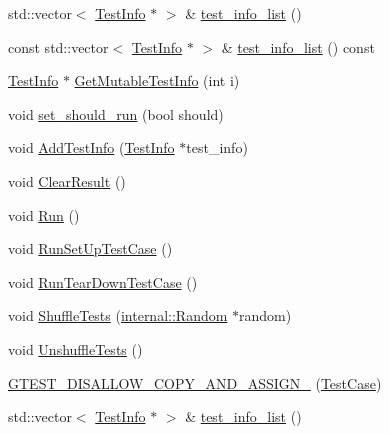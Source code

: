 \begin{DoxyCompactItemize}
\item 
std\-::vector$<$ \hyperlink{classtesting_1_1TestInfo}{\-Test\-Info} $\ast$ $>$ \& \hyperlink{classtesting_1_1TestCase_aaa94fcfd7f8161d39504f535fa995c2d}{test\-\_\-info\-\_\-list} ()
\item 
const std\-::vector$<$ \hyperlink{classtesting_1_1TestInfo}{\-Test\-Info} $\ast$ $>$ \& \hyperlink{classtesting_1_1TestCase_af56750ff9e6c7865f20ae51cfc8d793e}{test\-\_\-info\-\_\-list} () const 
\item 
\hyperlink{classtesting_1_1TestInfo}{\-Test\-Info} $\ast$ \hyperlink{classtesting_1_1TestCase_aeea35099284cdd7127924592152e3b73}{\-Get\-Mutable\-Test\-Info} (int i)
\item 
void \hyperlink{classtesting_1_1TestCase_ab3f3dbe8ef52473f912aef44d04193d5}{set\-\_\-should\-\_\-run} (bool should)
\item 
void \hyperlink{classtesting_1_1TestCase_a2a0417de1ee92080aae4676c77318b01}{\-Add\-Test\-Info} (\hyperlink{classtesting_1_1TestInfo}{\-Test\-Info} $\ast$test\-\_\-info)
\item 
void \hyperlink{classtesting_1_1TestCase_a566dca6156477ed747aa781f341d13d5}{\-Clear\-Result} ()
\item 
void \hyperlink{classtesting_1_1TestCase_aa3eca255b6be227d7d901cc2a72017a5}{\-Run} ()
\item 
void \hyperlink{classtesting_1_1TestCase_a0a9185d58f27f485506f4c0dedaab124}{\-Run\-Set\-Up\-Test\-Case} ()
\item 
void \hyperlink{classtesting_1_1TestCase_a68c2b3492b96c37271344d40a79caa84}{\-Run\-Tear\-Down\-Test\-Case} ()
\item 
void \hyperlink{classtesting_1_1TestCase_a0005a140538304e16d0bbd0bf08b3b65}{\-Shuffle\-Tests} (\hyperlink{classtesting_1_1internal_1_1Random}{internal\-::\-Random} $\ast$random)
\item 
void \hyperlink{classtesting_1_1TestCase_ae4c0afbfb6a7d13aece4c3a256a5d01d}{\-Unshuffle\-Tests} ()
\item 
\hyperlink{classtesting_1_1TestCase_a589179a7edfbdc3809f75a5bd7090dee}{\-G\-T\-E\-S\-T\-\_\-\-D\-I\-S\-A\-L\-L\-O\-W\-\_\-\-C\-O\-P\-Y\-\_\-\-A\-N\-D\-\_\-\-A\-S\-S\-I\-G\-N\-\_\-} (\hyperlink{classtesting_1_1TestCase}{\-Test\-Case})
\item 
std\-::vector$<$ \hyperlink{classtesting_1_1TestInfo}{\-Test\-Info} $\ast$ $>$ \& \hyperlink{classtesting_1_1TestCase_aaa94fcfd7f8161d39504f535fa995c2d}{test\-\_\-info\-\_\-list} ()
\item 

\end{DoxyCompactItemize}
